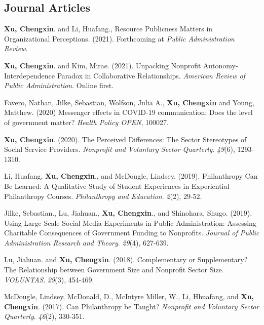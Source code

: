 \documentclass[letterpaper]{article}
\renewenvironment{itemize}{
  \begin{list}{}{
    \setlength{\leftmargin}{1.5em}
  }
}{
  \end{list}
}
\begin{document}
\subsection*{Journal Articles}

\begin{itemize}

\item \textbf{Xu, Chengxin}. and Li, Huafang., Resource Publicness Matters in Organizational Perceptions. (2021). Forthcoming at {\it Public Administration Review}.

\item \textbf{Xu, Chengxin}. and Kim, Mirae. (2021). Unpacking Nonprofit Autonomy-Interdependence Paradox in Collaborative Relationships. {\it American Review of Public Administration}. Online first.

\item Favero, Nathan, Jilke, Sebastian, Wolfson, Julia A., \textbf{Xu, Chengxin} and Young, Matthew. (2020) Messenger effects in COVID-19 communication: Does the level of government matter? {\it Health Policy OPEN}, 100027. 

\item \textbf{Xu, Chengxin}. (2020). The Perceived Differences: The Sector Stereotypes of Social Service Providers. {\it Nonprofit and Voluntary Sector Quarterly}.	{\it 49}(6), 1293-1310.

\item Li, Huafang, \textbf{Xu, Chengxin}., and McDougle, Lindsey. (2019). Philanthropy Can Be Learned: A Qualitative Study of Student Experiences in Experiential Philanthropy Courses. {\it Philanthropy and Education}. {\it 2}(2), 29-52.

\item Jilke, Sebastian., Lu, Jiahuan., \textbf{Xu, Chengxin}., and Shinohara, Shugo. (2019). Using Large Scale Social Media Experiments in Public Administration: Assessing Charitable Consequences of Government Funding to Nonprofits. {\it Journal of Public Administration Research and Theory}. {\it 29}(4), 627-639.

\item Lu, Jiahuan. and \textbf{Xu, Chengxin}. (2018). Complementary or Supplementary? The Relationship between Government Size and Nonprofit Sector Size. {\it VOLUNTAS}. {\it 29}(3), 454-469.

\item McDougle, Lindsey, McDonald, D., McIntyre Miller, W., Li, Hhuafang, and \textbf{Xu, Chengxin}. (2017). Can Philanthropy be Taught? {\it Nonprofit and Voluntary Sector Quarterly}. {\it 46}(2), 330-351. 

\end{itemize}
\end{document}

